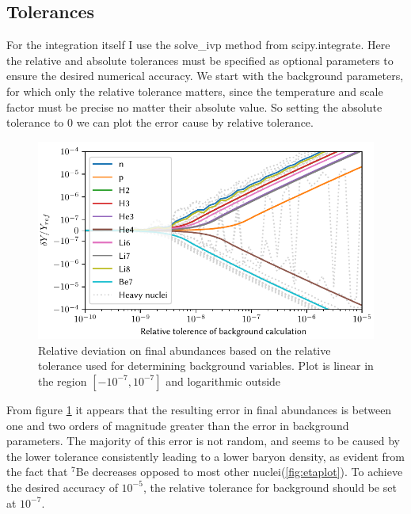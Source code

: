 \subsection{Tolerances}
For the integration itself I use the solve\_ivp method from scipy.integrate\cite{SciPy}. Here the relative and absolute tolerances must be specified as optional parameters to ensure the desired numerical accuracy. We start with the background parameters, for which only the relative tolerance matters, since the temperature and scale factor must be precise no matter their absolute value. So setting the absolute tolerance to 0 we can plot the error cause by relative tolerance.
\begin{figure}[ht]
    \includegraphics[width=5.1in]{figures/rtolbackground.pdf}
    \caption{Relative deviation on final abundances based on the relative tolerance used for determining background variables. Plot is linear in the region $[-10^{-7},10^{-7}]$ and logarithmic outside}
    \label{fig:rtolbackground}
\end{figure}
From figure \ref{fig:rtolbackground} it appears that the resulting error in final abundances is between one and two orders of magnitude greater than the error in background parameters. The majority of this error is not random, and seems to be caused by the lower tolerance consistently leading to a lower baryon density, as evident from the fact that ${}^{7}$Be decreases opposed to most other nuclei(\cref{fig:etaplot}). To achieve the desired accuracy of $10^{-5}$, the relative tolerance for background should be set at $10^{-7}$.

